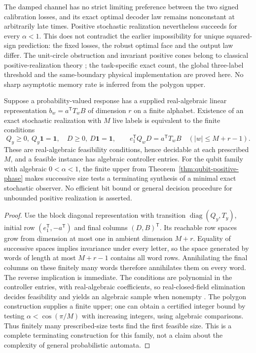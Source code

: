 The damped channel has no strict limiting preference between the two signed calibration losses, and its exact optimal decoder law remains nonconstant at arbitrarily late times. Positive stochastic realization nevertheless succeeds for every $\alpha<1$. This does not contradict the earlier impossibility for unique squared-sign prediction: the fixed losses, the robust optimal face and the output law differ. The unit-circle obstruction and invariant positive cones belong to classical positive-realization theory \cite{MonrasWinter14}; the task-specific exact count, the global three-label threshold and the same-boundary physical implementation are proved here. No sharp asymptotic memory rate is inferred from the polygon upper.

\begin{proposition}\label{prop:finite-realization-test}
Suppose a probability-valued response has a supplied real-algebraic linear representation
$b_w=a^{\mathsf T}T_wB$ of dimension $r$ on a finite alphabet. Existence of an exact stochastic realization with $M$ live labels is equivalent to the finite conditions
\[
 Q_y\ge0,\ Q_y\mathbf1=\mathbf1,\quad D\ge0,\ D\mathbf1=\mathbf1,
 \qquad e_1^{\mathsf T}Q_wD=a^{\mathsf T}T_wB
       \quad(|w|\le M+r-1).
\]
These are real-algebraic feasibility conditions, hence decidable at each prescribed $M$, and a feasible instance has algebraic controller entries. For the qubit family with algebraic $0<\alpha<1$, the finite upper from Theorem~\ref{thm:qubit-positive-phase} makes successive size tests a terminating synthesis of a minimal exact stochastic observer. No efficient bit bound or general decision procedure for unbounded positive realization is asserted.
\end{proposition}
\begin{proof}
Use the block diagonal representation with transition $\operatorname{diag}(Q_y,T_y)$, initial row $(e_1^{\mathsf T},-a^{\mathsf T})$ and final columns $(D,B)^{\mathsf T}$. Its reachable row spaces grow from dimension at most one in ambient dimension $M+r$. Equality of successive spaces implies invariance under every letter, so the space generated by words of length at most $M+r-1$ contains all word rows. Annihilating the final columns on these finitely many words therefore annihilates them on every word. The reverse implication is immediate. The conditions are polynomial in the controller entries, with real-algebraic coefficients, so real-closed-field elimination decides feasibility and yields an algebraic sample when nonempty \cite{Seidenberg54}. The polygon construction supplies a finite upper; one can obtain a certified integer bound by testing $\alpha<\cos(\pi/M)$ with increasing integers, using algebraic comparisons. Thus finitely many prescribed-size tests find the first feasible size. This is a complete terminating construction for this family, not a claim about the complexity of general probabilistic automata.
\end{proof}

